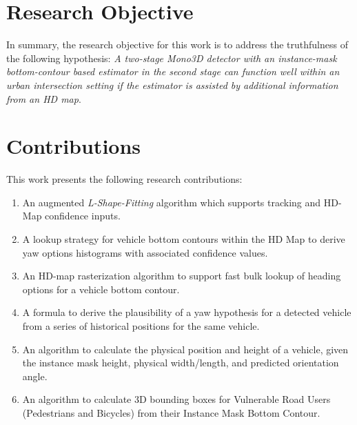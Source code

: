 \section{Research Objective}
\label{sec:objective}

In summary, the research objective for this work is to address the truthfulness of the following hypothesis: \textit{A two-stage \textit{Mono3D} detector with an instance-mask bottom-contour based estimator in the second stage can function well within an urban intersection setting if the estimator is assisted by additional information from an HD map}.

\section{Contributions}
\label{sec:contributions}

This work presents the following research contributions:

\begin{enumerate}
    \item An augmented \textit{L-Shape-Fitting} algorithm which supports tracking and HD-Map confidence inputs.
    \item A lookup strategy for vehicle bottom contours within the HD Map to derive yaw options histograms with associated confidence values.
    \item An HD-map rasterization algorithm to support fast bulk lookup of heading options for a vehicle bottom contour.
    \item A formula to derive the plausibility of a yaw hypothesis for a detected vehicle from a series of historical positions for the same vehicle.
    \item An algorithm to calculate the physical position and height of a vehicle, given the instance mask height, physical width/length, and predicted orientation angle.
    \item An algorithm to calculate 3D bounding boxes for Vulnerable Road Users (Pedestrians and Bicycles) from their Instance Mask Bottom Contour.
\end{enumerate}
